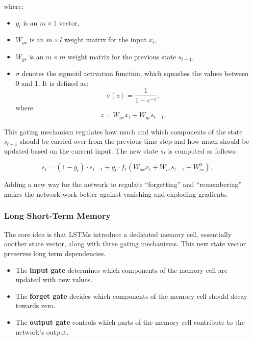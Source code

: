     where:
    \begin{itemize}
        \item \( g_t \) is an \( m \times 1 \) vector,
        \item \( W_{gx} \) is an \( m \times l \) weight matrix for the input \( x_t \),
        \item \( W_{gs} \) is an \( m \times m \) weight matrix for the previous state \( s_{t-1} \),
        \item \( \sigma \) denotes the sigmoid activation function, which squashes the values between 0 and 1. It is defined as:
        \begin{equation}
            \sigma(z) = \frac{1}{1 + e^{-z}},
        \end{equation}
        where
        \begin{equation}
            z = W_{gx} x_t + W_{gs} s_{t-1}.
        \end{equation}
    \end{itemize}
    
    This gating mechanism regulates how much and which components of the state \( s_{t-1} \) should be carried over from the previous time step and how much should be updated based on the current input. The new state \( s_t \) is computed as follows:
    
    \begin{equation}
        s_t = (1 - g_t) \cdot s_{t-1} + g_t \cdot f_1(W_{sx} x_t + W_{ss} s_{t-1} + W_{ss}^0),
    \end{equation}

    Adding a new way for the network to regulate ``forgetting'' and ``remembering'' makes the network work better against vanishing and exploding gradients.
    
    \subsubsection{Long Short-Term Memory}
   

The core idea is that LSTMs introduce a dedicated memory cell, essentially another state vector, along with three gating mechanisms. This new state vector preserves long term dependencies.

\begin{itemize}
    \item The \textbf{input gate} determines which components of the memory cell are updated with new values.
    \item The \textbf{forget gate} decides which components of the memory cell should decay towards zero.
    \item The \textbf{output gate} controls which parts of the memory cell contribute to the network’s output.
\end{itemize}

